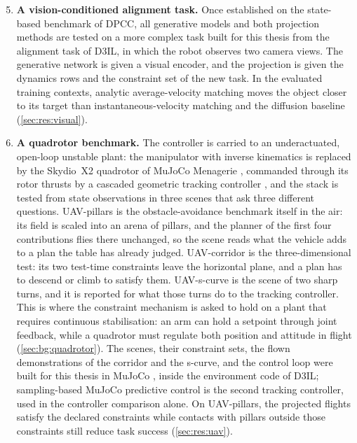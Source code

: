 \begin{enumerate}
  \setcounter{enumi}{4}
  \item \textbf{A vision-conditioned alignment task.} Once established on the state-based benchmark
    of \ac{DPCC}, all generative models and both projection methods are tested on a more complex
    task built for this thesis from the alignment task of D3IL, in which the robot observes two camera
    views. The generative network is given a visual encoder, and the projection is given the dynamics
    rows and the constraint set of the new task.
    In the evaluated training contexts, analytic average-velocity matching moves the object closer
    to its target than instantaneous-velocity matching and the diffusion baseline
    (\autoref{sec:res:visual}).
  \item \textbf{A quadrotor benchmark.} The controller is carried to an underactuated, open-loop
    unstable plant: the manipulator with inverse kinematics is replaced by the Skydio~X2 quadrotor of
    MuJoCo Menagerie \parencite{zakka2022menagerie}, commanded through its rotor thrusts by a cascaded
    geometric tracking controller \parencite{lee2010geometric}, and the stack is tested from state
    observations in three scenes that ask three different questions. UAV-pillars is the
    obstacle-avoidance benchmark itself in the air: its field is scaled into an arena of pillars, and
    the planner of the first four contributions flies there unchanged, so the scene reads what the
    vehicle adds to a plan the table has already judged. UAV-corridor is the three-dimensional test:
    its two test-time constraints leave the horizontal plane, and a plan has to descend or climb to
    satisfy them. UAV-s-curve is the scene of two sharp turns, and it is reported for what those turns
    do to the tracking controller. This is where the constraint mechanism is asked to hold on a plant
    that requires continuous stabilisation: an arm can hold a setpoint through joint feedback, while
    a quadrotor must regulate both position and attitude in flight
    (\autoref{sec:bg:quadrotor}). The scenes, their constraint sets, the flown demonstrations of the
    corridor and the s-curve, and the control loop were built for this thesis in MuJoCo
    \parencite{todorov2012mujoco}, inside the environment code of D3IL; sampling-based MuJoCo
    predictive control \parencite{howell2022predictive} is the second tracking controller, used in
    the controller comparison alone.
    On UAV-pillars, the projected flights satisfy the declared constraints while contacts with
    pillars outside those constraints still reduce task success (\autoref{sec:res:uav}).
\end{enumerate}

